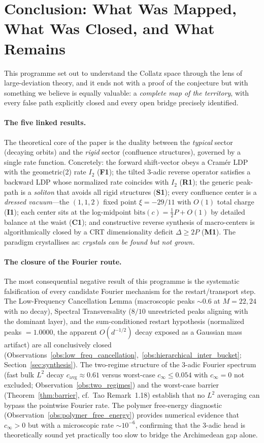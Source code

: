 \documentclass[12pt,a4paper]{article}
\theoremstyle{remark}
\begin{document}
\section{Conclusion: What Was Mapped, What Was Closed, and What Remains}
\label{sec:conclusion}
This programme set out to understand the Collatz space through the lens of
large-deviation theory, and it ends not with a proof of the conjecture but
with something we believe is equally valuable: a \emph{complete map of the
territory}, with every false path explicitly closed and every open bridge
precisely identified.
\paragraph{The five linked results.}
The theoretical core of the paper is the duality between the \emph{typical}
sector (decaying orbits) and the \emph{rigid} sector (confluence structures),
governed by a single rate function.  Concretely: the forward shift-vector
obeys a Cram\'er LDP with the geometric(2) rate $I_2$ (\textbf{F1}); the
tilted $3$-adic reverse operator satisfies a backward LDP whose normalized
rate coincides with $I_2$ (\textbf{R1}); the generic peak-path is a
\emph{soliton} that avoids all rigid structures (\textbf{S1}); every
confluence center is a \emph{dressed vacuum}---the $(1,1,2)$ fixed point
$\xi=-29/11$ with $O(1)$ total charge (\textbf{I1}); each center sits at the
log-midpoint $\mathrm{bits}(c)=\tfrac12 P+O(1)$ by detailed balance at the
waist (\textbf{C1}); and constructive reverse synthesis of macro-centers is
algorithmically closed by a CRT dimensionality deficit $\Delta\ge2P$
(\textbf{M1}).  The paradigm crystallises as: \emph{crystals can be found but
not grown.}
\paragraph{The closure of the Fourier route.}
The most consequential negative result of this programme is the systematic
falsification of every candidate Fourier mechanism for the restart/transport
step.  The Low-Frequency Cancellation Lemma (macroscopic peaks $\sim0.6$ at
$M=22,24$ with no decay), Spectral Transversality ($8/10$ unrestricted peaks
aligning with the dominant layer), and the sum-conditioned restart hypothesis
(normalized peaks $=1.0000$, the apparent $O(d^{-1/2})$ decay exposed as a
Gaussian mass artifact) are all conclusively closed
(Observations~\ref{obs:low_freq_cancellation},~\ref{obs:hierarchical_inter_bucket};
Section~\ref{sec:synthesis}).  The two-regime structure of the $3$-adic
Fourier spectrum (fast bulk $L^2$ decay $c_{\mathrm{avg}}\approx0.61$ versus
worst-case $c_\infty\le0.054$ with $c_\infty=0$ not excluded;
Observation~\ref{obs:two_regimes}) and the worst-case barrier
(Theorem~\ref{thm:barrier}, cf.\ Tao Remark~1.18) establish that no $L^2$
averaging can bypass the pointwise Fourier rate.  The polymer free-energy
diagnostic (Observation~\ref{obs:polymer_free_energy}) provides numerical
evidence that $c_\infty>0$ but with a microscopic rate $\sim10^{-6}$,
confirming that the $3$-adic head is theoretically sound yet practically too
slow to bridge the Archimedean gap alone.
\end{document}
